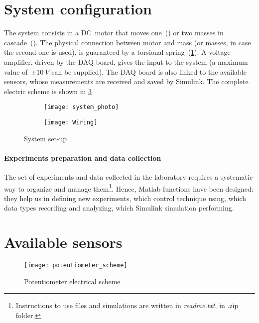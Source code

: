 
\section{System configuration}

The system consists in a DC~motor that moves one~(\onedof) or two masses in cascade~(\twodof). The physical connection between motor and mass (or masses, in case the second one is used), is guaranteed by a torsional spring~(\cref{fig:system_setup}).
A voltage amplifier, driven by the DAQ board, gives the input to the system (a maximum value of~$\pm 10 \ V$ can be supplied). The DAQ board is also linked to the available sensors, whose measurements are received and saved by Simulink. The complete electric scheme is shown in \cref{fig:wiring}
\begin{figure}[h]
	\centering
	\begin{subfigure}{0.45\columnwidth}
		\texttt{[image: system\_photo]}
		\label{fig:system_setup}
	\end{subfigure}
	\begin{subfigure}{0.45\columnwidth}
		\centering
		\texttt{[image: Wiring]}
		\label{fig:wiring}
	\end{subfigure}
	\caption{System set-up}
\end{figure}

\paragraph{Experiments preparation and data collection}

The set of experiments and data collected in the laboratory requires a systematic way to organize and manage them\footnote{Instructions to use files and simulations are written in \textit{readme.txt}, in .zip folder.}. Hence, Matlab functions have been designed: they help us in defining new experiments, which control technique using, which data types recording and analyzing, which Simulink simulation performing.

\section{Available sensors}
\label{sec:sensors}

\begin{wrapfigure}{r}{0.3\textwidth}
	\centering
	\texttt{[image: potentiometer\_scheme]}
	\caption{Potentiometer electrical scheme}
\end{wrapfigure}

